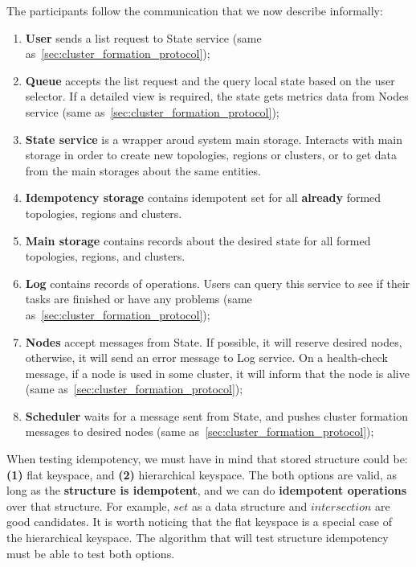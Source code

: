 \noindent
The participants follow the communication that we now describe informally: \label{informal_description_idempotency}

\begin{enumerate}[start=1,label={(\bfseries \arabic*)}]
	\item \textbf{User} sends a list request to State service (same as~\ref{sec:cluster_formation_protocol});
	\item \textbf{Queue} accepts the list request and the query local state based on the user selector. If a detailed view is required, the state gets metrics data from Nodes service (same as~\ref{sec:cluster_formation_protocol});
	\item \textbf{State service} is a wrapper aroud system main storage. Interacts with main storage in order to create new topologies, regions or clusters, or to get data from the main storages about the same entities. 
	\item \textbf{Idempotency storage} contains idempotent set for all \textbf{already} formed topologies, regions and clusters.
	\item \textbf{Main storage} contains records about the desired state for all formed topologies, regions, and clusters.
	\item \textbf{Log} contains records of operations. Users can query this service to see if their tasks are finished or have any problems (same as~\ref{sec:cluster_formation_protocol});
	\item \textbf{Nodes} accept messages from State. If possible, it will reserve desired nodes, otherwise, it will send an error message to Log service. On a health-check message, if a node is used in some cluster, it will inform that the node is alive (same as~\ref{sec:cluster_formation_protocol});
	\item \textbf{Scheduler} waits for a message sent from State, and pushes cluster formation messages to desired nodes (same as~\ref{sec:cluster_formation_protocol});
\end{enumerate}

\noindent
When testing idempotency, we must have in mind that stored structure could be: \textbf{(1)} flat keyspace, and \textbf{(2)} hierarchical keyspace. The both options are valid, as long as the \textbf{structure is idempotent}, and we can do \textbf{idempotent operations} over that structure. For example, $set$ as a data structure and $intersection$ are good candidates. It is worth noticing that the flat keyspace is a special case of the hierarchical keyspace.%
The algorithm that will test structure idempotency must be able to test both options.

